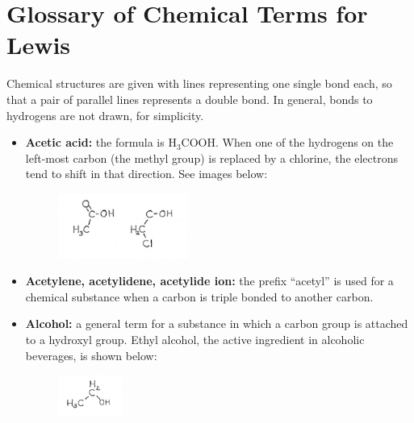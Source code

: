 \documentclass[11pt]{memoir}
\begin{document}
\section*{Glossary of Chemical Terms for Lewis}

Chemical structures are given with lines representing one single bond each, so that a pair of parallel lines represents a double bond.  In general, bonds to hydrogens are not drawn, for simplicity. 

\begin{itemize}


\item[]{\textbf{Acetic acid:} the formula is $\mathrm{H_3COOH}$.  When one of the hydrogens on the left-most carbon (the methyl group) is replaced by a chlorine, the electrons tend to shift in that direction.  See images below:}



\begin{figure}[h]
\vspace{-15pt}
\begin{center}
\includegraphics[width=0.4\textwidth]{images/lewis_notefig1.png}
\end{center}
\vspace{-30pt}
\end{figure}



\item[]{\textbf{Acetylene, acetylidene, acetylide ion:} the prefix ``acetyl'' is used for a chemical substance when a carbon is triple bonded to another carbon.}	
	
\item[]{\textbf{Alcohol:} a general term for a substance in which a carbon group is attached to a hydroxyl group.  Ethyl alcohol, the active ingredient in alcoholic beverages, is shown below:}

\begin{figure}[h]
\vspace{-15pt}
\begin{center}
\includegraphics[width=0.2\textwidth]{images/lewis_notefig2a.png}
\end{center}
\vspace{-30pt}
\end{figure}



\end{itemize}
\end{document}
